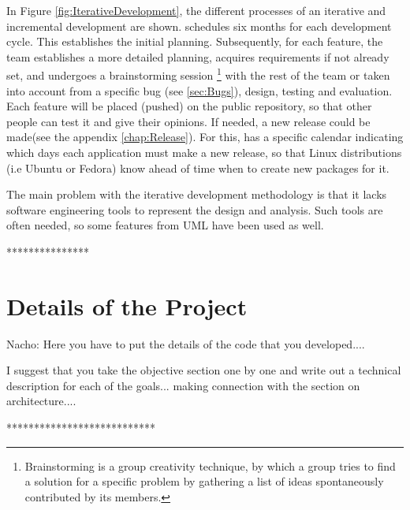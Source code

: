 In Figure \ref{fig:IterativeDevelopment}, the different processes of an iterative and incremental 
development are shown.  \GNOME schedules six months for each development cycle. This establishes the initial planning. 
Subsequently, for each feature, the team establishes a more detailed planning, acquires requirements if not already set, 
and undergoes a brainstorming session \footnote{Brainstorming is a group creativity technique, by which a group tries to find a 
solution for a specific problem by gathering a list of ideas spontaneously contributed by its members.} with the 
rest of the team or taken into account from a specific bug (see \ref{sec:Bugs}), design, testing and evaluation. 
Each feature will be placed (pushed) on the public repository,  so that other people can test it and give their opinions. 
If needed, a new release could be made(see the appendix \ref{chap:Release}).  For this, \GNOME has a specific calendar indicating 
which days each application must make a new release, so that Linux distributions (i.e Ubuntu or Fedora) 
know ahead of time when to create new packages for it.

The main problem with the iterative development methodology is that it lacks software engineering tools 
to represent the design and analysis.  Such tools are often needed, so some features from UML have been used as well.





***************\section{Details of the Project}


Nacho:  Here you have to put the details of the code that you developed....


I suggest that you take the objective section one by one and write out 
a technical description for each of the goals... making connection with the 
section on architecture....


***************************






